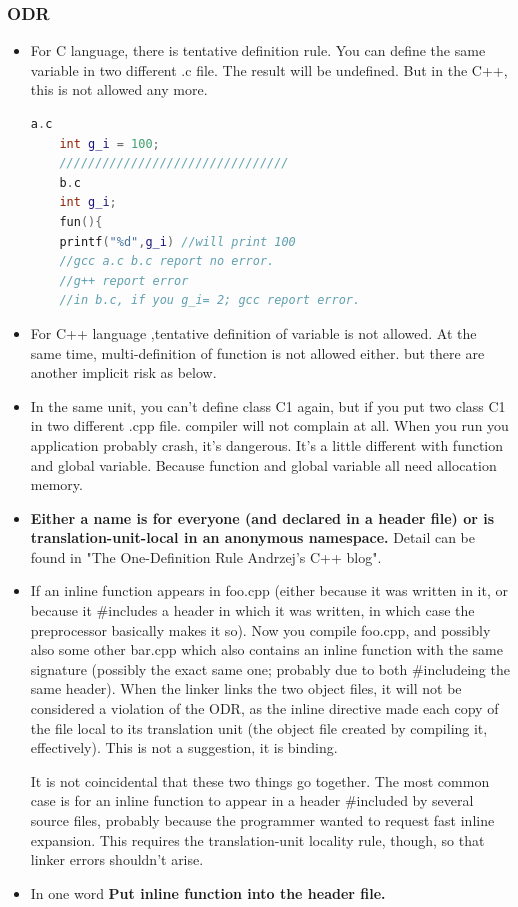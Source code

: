 \documentclass[a4paper,12pt,twoside]{book}
\begin{document}
\subsubsection{ODR}
\begin{itemize}
	
	\item For C language, there is tentative definition rule. You can define the same variable in two different .c file. The result will be undefined. But in the C++, this is not allowed any more. 
	
	\begin{lstlisting}[frame=single, language=c++]
	a.c
	int g_i = 100;
	////////////////////////////////
	b.c
	int g_i;
	fun(){
	printf("%d",g_i) //will print 100
	//gcc a.c b.c report no error.
	//g++ report error
	//in b.c, if you g_i= 2; gcc report error.
	\end{lstlisting}
	
	\item For C++ language ,tentative definition of variable is not allowed. At the same time, multi-definition of function is not allowed either. but there are another implicit risk as below. 
	
	\item In the same unit, you can't define class C1 again, but if you put two class C1 in two different .cpp file. compiler will not complain at all. When you run you application probably crash, it's dangerous. It's a little different with function and global variable. Because function and global variable all need allocation memory.
	
	\item \textbf{Either a name is for everyone (and declared in a header file) or is translation-unit-local in an anonymous namespace.} Detail can be found in "The One-Definition Rule  Andrzej's C++ blog".
	
	\item  If an inline function appears in foo.cpp (either because it was written in it, or because it \#includes a header in which it was written, in which case the preprocessor basically makes it so). Now you compile foo.cpp, and possibly also some other bar.cpp which also contains an inline function with the same signature (possibly the exact same one; probably due to both \#includeing the same header). When the linker links the two object files, it will not be considered a violation of the ODR, as the inline directive made each copy of the file local to its translation unit (the object file created by compiling it, effectively). This is not a suggestion, it is binding.
	
	It is not coincidental that these two things go together. The most common case is for an inline function to appear in a header \#included by several source files, probably because the programmer wanted to request fast inline expansion. This requires the translation-unit locality rule, though, so that linker errors shouldn't arise.
	
	\item In one word \textbf{Put inline function into the header file.}
\end{itemize}
\end{document}
